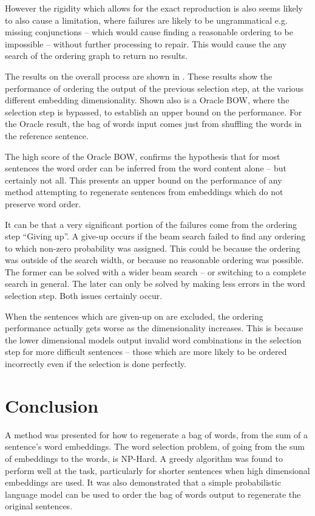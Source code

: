 \documentclass[11pt]{article}
\theoremstyle{plain}
\theoremstyle{definition}
\begin{document}
However the rigidity which allows for the exact reproduction is also seems likely to also cause a limitation, where failures are likely to be ungrammatical e.g. missing conjunctions -- which would cause finding a reasonable ordering to be impossible -- without further processing to repair. This would cause the any search of the ordering graph to return no results.


The results on the overall process are shown in . These results show the performance of ordering the output of the previous selection step, at the various different embedding dimensionality. Shown also is a Oracle BOW, where the selection step is bypassed, to establish an upper bound on the performance. For the Oracle result, the bag of words input comes just from shuffling the words in the reference sentence.

The high score of the Oracle BOW, confirms the hypothesis that for most sentences the word order can be inferred from the word content alone -- but certainly not all. This presents an upper bound on the performance of any method attempting to regenerate sentences from embeddings which do not preserve word order. 

It can be that a very significant portion of the failures come from the ordering step ``Giving up''. A give-up occurs if the beam search failed to find any ordering to which non-zero probability was assigned. This could be because the ordering was outside of the search width, or because no reasonable ordering was possible. The former can be solved with a wider beam search -- or switching to a complete search in general. The later can only be solved by making less errors in the word selection step. Both issues certainly occur. 

When the sentences which are given-up on are excluded, the ordering performance actually gets worse as the dimensionality increases. This is because the lower dimensional models output invalid word combinations in the selection step for more difficult sentences -- those which are more likely to be ordered incorrectly even if the selection is done perfectly.




\section{Conclusion} \label{conclusion}
A method was presented for how to regenerate a bag of words, from the sum of a sentence's word embeddings. The word selection problem, of going from the sum of embeddings to the words, is NP-Hard. A greedy algorithm was found to perform well at the task, particularly for shorter sentences when high dimensional embeddings are used. It was also demonstrated that a simple probabilistic language model can be used to order the bag of words output to regenerate the original sentences.
\end{document}
